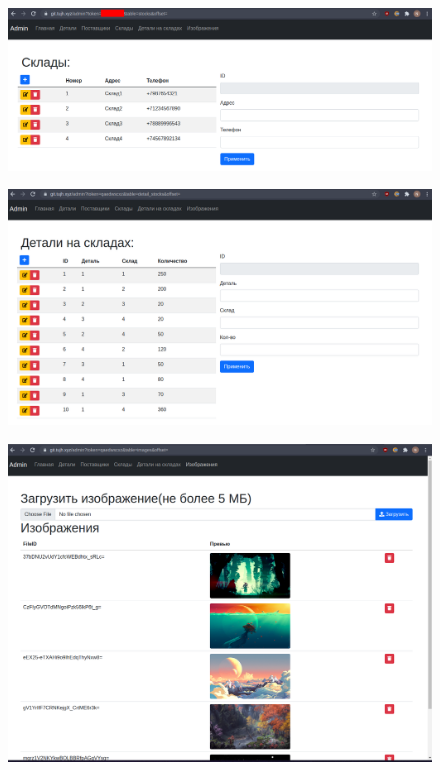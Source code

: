 \documentclass[20pt,a4paper]{report}
\begin{document}
		\begin{figure}[H]
			\includegraphics[width=\textwidth]{7.png}
		\end{figure}
		\begin{figure}[H]
			\includegraphics[width=\textwidth]{8.png}
		\end{figure}
		\begin{figure}[H]
			\includegraphics[width=\textwidth]{9.png}
		\end{figure}
\end{document}
